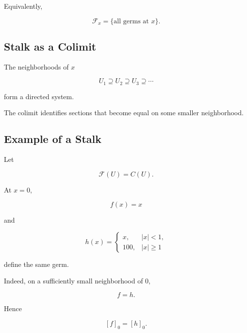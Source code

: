 \documentclass[12pt,a4paper]{article}
\theoremstyle{notespace}
\begin{document}
Equivalently,

\[
\boxed{
	\mathcal F_x
	=
	\{\text{all germs at }x\}.
}
\]

\subsection{Stalk as a Colimit}

The neighborhoods of \(x\)

\[
U_1 \supseteq U_2 \supseteq U_3 \supseteq \cdots
\]

form a directed system.

\begin{center}
\end{center}

The colimit identifies sections that become equal on some smaller neighborhood.

\subsection{Example of a Stalk}

Let

\[
\mathcal F(U)=C(U).
\]

At \(x=0\),

\[
f(x)=x
\]

and

\[
h(x)=
\begin{cases}
	x,& |x|<1,\\
	100,& |x|\ge 1
\end{cases}
\]

define the same germ.

Indeed, on a sufficiently small neighborhood of \(0\),

\[
f=h.
\]

Hence

\[
[f]_0=[h]_0.
\]
\end{document}
